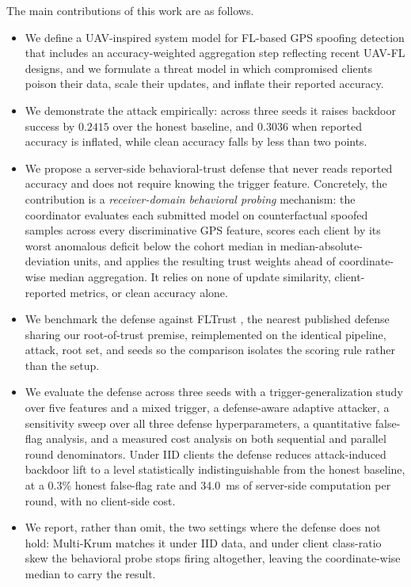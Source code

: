 \documentclass[journal]{IEEEtran}
\begin{document}
The main contributions of this work are as follows.
\begin{itemize}
    \item We define a UAV-inspired system model for FL-based GPS spoofing detection that includes an accuracy-weighted aggregation step reflecting recent UAV-FL designs, and we formulate a threat model in which compromised clients poison their data, scale their updates, and inflate their reported accuracy.
    \item We demonstrate the attack empirically: across three seeds it raises backdoor success by $0.2415$ over the honest baseline, and $0.3036$ when reported accuracy is inflated, while clean accuracy falls by less than two points.
    \item We propose a server-side behavioral-trust defense that never reads reported accuracy and does not require knowing the trigger feature. Concretely, the contribution is a \emph{receiver-domain behavioral probing} mechanism: the coordinator evaluates each submitted model on counterfactual spoofed samples across every discriminative GPS feature, scores each client by its worst anomalous deficit below the cohort median in median-absolute-deviation units, and applies the resulting trust weights ahead of coordinate-wise median aggregation. It relies on none of update similarity, client-reported metrics, or clean accuracy alone.
    \item We benchmark the defense against FLTrust \cite{cao2021fltrust}, the nearest published defense sharing our root-of-trust premise, reimplemented on the identical pipeline, attack, root set, and seeds so the comparison isolates the scoring rule rather than the setup.
    \item We evaluate the defense across three seeds with a trigger-generalization study over five features and a mixed trigger, a defense-aware adaptive attacker, a sensitivity sweep over all three defense hyperparameters, a quantitative false-flag analysis, and a measured cost analysis on both sequential and parallel round denominators. Under IID clients the defense reduces attack-induced backdoor lift to a level statistically indistinguishable from the honest baseline, at a 0.3\% honest false-flag rate and 34.0~ms of server-side computation per round, with no client-side cost.
    \item We report, rather than omit, the two settings where the defense does not hold: Multi-Krum matches it under IID data, and under client class-ratio skew the behavioral probe stops firing altogether, leaving the coordinate-wise median to carry the result.
\end{itemize}
\end{document}
